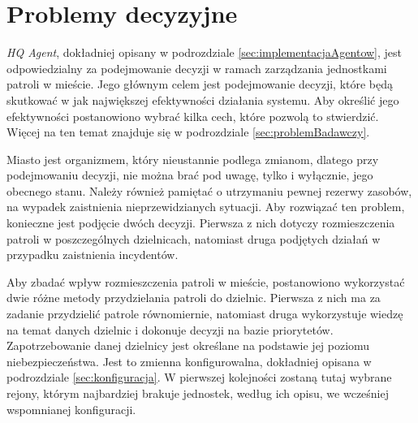 \section{Problemy decyzyjne}
\label{sec:algorytmDecyzyjny}

\par \emph{HQ Agent}, dokładniej opisany w podrozdziale \ref{sec:implementacjaAgentow}, jest odpowiedzialny za podejmowanie decyzji w ramach zarządzania jednostkami patroli w mieście. Jego głównym celem jest podejmowanie decyzji, które będą skutkować w jak największej efektywności działania systemu. Aby określić jego efektywności postanowiono wybrać kilka cech, które pozwolą to stwierdzić. Więcej na ten temat znajduje się w podrozdziale \ref{sec:problemBadawczy}.

\par Miasto jest organizmem, który nieustannie podlega zmianom, dlatego przy podejmowaniu decyzji, nie można brać pod uwagę, tylko i wyłącznie, jego obecnego stanu. Należy również pamiętać o utrzymaniu pewnej rezerwy zasobów, na wypadek zaistnienia nieprzewidzianych sytuacji. Aby rozwiązać ten problem, konieczne jest podjęcie dwóch decyzji. Pierwsza z nich dotyczy rozmieszczenia patroli w poszczególnych dzielnicach, natomiast druga podjętych działań w przypadku zaistnienia incydentów.

\par Aby zbadać wpływ rozmieszczenia patroli w mieście, postanowiono wykorzystać dwie różne metody przydzielania patroli do dzielnic. Pierwsza z nich ma za zadanie przydzielić patrole równomiernie, natomiast druga wykorzystuje wiedzę na temat danych dzielnic i dokonuje decyzji na bazie priorytetów. Zapotrzebowanie danej dzielnicy jest określane na podstawie jej poziomu niebezpieczeństwa. Jest to zmienna konfigurowalna, dokładniej opisana w podrozdziale \ref{sec:konfiguracja}. W pierwszej kolejności zostaną tutaj wybrane rejony, którym najbardziej brakuje jednostek, według ich opisu, we wcześniej wspomnianej konfiguracji.

